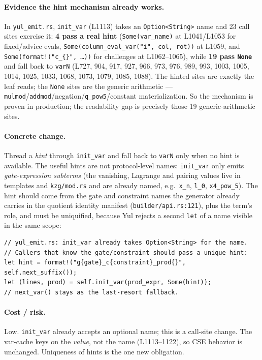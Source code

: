 \paragraph{Evidence the hint mechanism already works.} In
\texttt{yul\_emit.rs}, \texttt{init\_var} (L1113) takes an
\texttt{Option<String>} name and 23 call sites exercise it: \textbf{4 pass a
real hint} (\texttt{Some(var\_name)} at L1041/L1053 for fixed/advice evals,
\texttt{Some(column\_\allowbreak{}eval\_\allowbreak{}var("i", col, rot))} at L1059, and
\texttt{Some(format!("c\_\allowbreak{}\{\}", \ldots))} for challenges at L1062--1065),
while \textbf{19 pass \texttt{None}} and fall back to \texttt{varN} (L727,
904, 917, 927, 966, 973, 976, 989, 993, 1003, 1005, 1014, 1025, 1033, 1068,
1073, 1079, 1085, 1088). The hinted sites are exactly the leaf reads; the
\texttt{None} sites are the generic arithmetic ---
\texttt{mulmod}/\texttt{addmod}/negation/\texttt{q\_pow5}/constant
materialization. So the mechanism is proven in production; the readability
gap is precisely those 19 generic-arithmetic sites.

\paragraph{Concrete change.} Thread a \emph{hint} through
\texttt{init\_var} and fall back to \texttt{varN} only when no hint is
available. The useful hints are not protocol-level names:
\texttt{init\_var} only emits \emph{gate-expression subterms} (the
vanishing, Lagrange and pairing values live in templates and
\texttt{kzg/mod.rs} and are already named, e.g.\ \texttt{x\_n},
\texttt{l\_0}, \texttt{x4\_pow\_5}). The hint should come from the gate and
constraint names the generator already carries in the quotient identity
manifest (\texttt{builder/\allowbreak{}api.rs:121}), plus the term's role, and must be
uniquified, because Yul rejects a second \texttt{let} of a name visible in
the same scope:

\begin{lstlisting}[style=rust]
// yul_emit.rs: init_var already takes Option<String> for the name.
// Callers that know the gate/constraint should pass a unique hint:
let hint = format!("g{gate}_c{constraint}_prod{}", self.next_suffix());
let (lines, prod) = self.init_var(prod_expr, Some(hint));
// next_var() stays as the last-resort fallback.
\end{lstlisting}

\paragraph{Cost / risk.} Low. \texttt{init\_var} already accepts an
optional name; this is a call-site change. The var-cache keys on the
\emph{value}, not the name (L1113--1122), so CSE behavior is unchanged.
Uniqueness of hints is the one new obligation.

